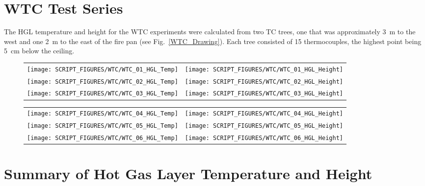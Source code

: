 \clearpage



\section{WTC Test Series}

The HGL temperature and height for the WTC experiments were calculated from two TC trees, one that was approximately 3~m to the west and one
2~m to the east of the fire pan (see Fig.~\ref{WTC_Drawing}). Each tree consisted of 15 thermocouples, the highest point being 5~cm below the ceiling.

\begin{figure}[h!]
\begin{tabular*}{\textwidth}{l@{\extracolsep{\fill}}r}
\texttt{[image: SCRIPT\_FIGURES/WTC/WTC\_01\_HGL\_Temp]} &
\texttt{[image: SCRIPT\_FIGURES/WTC/WTC\_01\_HGL\_Height]} \\
\texttt{[image: SCRIPT\_FIGURES/WTC/WTC\_02\_HGL\_Temp]} &
\texttt{[image: SCRIPT\_FIGURES/WTC/WTC\_02\_HGL\_Height]} \\
\texttt{[image: SCRIPT\_FIGURES/WTC/WTC\_03\_HGL\_Temp]} &
\texttt{[image: SCRIPT\_FIGURES/WTC/WTC\_03\_HGL\_Height]}
\end{tabular*}
\end{figure}

\newpage

\begin{figure}[p]
\begin{tabular*}{\textwidth}{l@{\extracolsep{\fill}}r}
\texttt{[image: SCRIPT\_FIGURES/WTC/WTC\_04\_HGL\_Temp]} &
\texttt{[image: SCRIPT\_FIGURES/WTC/WTC\_04\_HGL\_Height]} \\
\texttt{[image: SCRIPT\_FIGURES/WTC/WTC\_05\_HGL\_Temp]} &
\texttt{[image: SCRIPT\_FIGURES/WTC/WTC\_05\_HGL\_Height]} \\
\texttt{[image: SCRIPT\_FIGURES/WTC/WTC\_06\_HGL\_Temp]} &
\texttt{[image: SCRIPT\_FIGURES/WTC/WTC\_06\_HGL\_Height]}
\end{tabular*}
\end{figure}

\clearpage


\section{Summary of Hot Gas Layer Temperature and Height}
\label{HGL Temperature, Natural Ventilation}
\label{HGL Temperature, Forced Ventilation}
\label{HGL Temperature, No Ventilation}
\label{HGL Depth}



